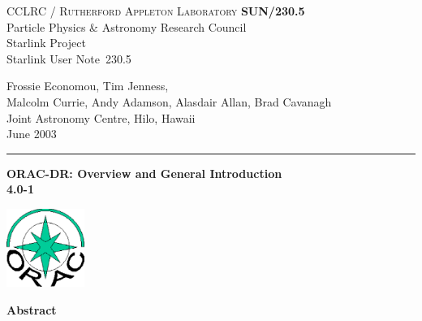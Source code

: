 \documentclass[twoside,11pt]{article}
\newcommand{\stardoccategory}  {Starlink User Note}
\newcommand{\stardocinitials}  {SUN}
\newcommand{\stardocnumber}    {230.5}
\newcommand{\stardocauthors}   {Frossie Economou, Tim Jenness,\\ 
Malcolm Currie, Andy Adamson, Alasdair Allan, Brad Cavanagh\\
Joint Astronomy Centre, Hilo, Hawaii}
\newcommand{\stardocdate}      {June 2003}
\newcommand{\stardoctitle}     {ORAC-DR: Overview and General Introduction}
\newcommand{\stardocversion}   {4.0-1}
\newcommand{\stardocmanual}    {}
\newcommand{\stardocname}{\stardocinitials /\stardocnumber}
\newenvironment{latexonly}{}{}
\renewcommand{\_}{\texttt{\symbol{95}}}
\begin{document}
\thispagestyle{empty}

\begin{latexonly}
   CCLRC / \textsc{Rutherford Appleton Laboratory} \hfill \textbf{\stardocname}\\
   {\large Particle Physics \& Astronomy Research Council}\\
   {\large Starlink Project\\}
   {\large \stardoccategory\ \stardocnumber}
   \begin{flushright}
   \stardocauthors\\
   \stardocdate
   \end{flushright}
   \vspace{-4mm}
   \rule{\textwidth}{0.5mm}
   \vspace{5mm}
   \begin{center}
   {\Huge\textbf{\stardoctitle \\ [2.5ex]}}
   {\LARGE\textbf{\stardocversion \\ [4ex]}}
   {\Huge\textbf{\stardocmanual}}
   \end{center}
   \vspace{5mm}

\begin{center}
\includegraphics[width=1.0in]{sun230_logo.eps}
\end{center}

   \vspace{10mm}
   \begin{center}
      {\Large\textbf{Abstract}}
   \end{center}
\end{latexonly}
\end{document}
